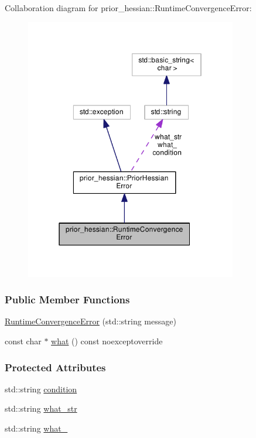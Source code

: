 Collaboration diagram for prior\+\_\+hessian\+:\+:Runtime\+Convergence\+Error\+:\nopagebreak
\begin{figure}[H]
\begin{center}
\leavevmode
\includegraphics[width=262pt]{structprior__hessian_1_1RuntimeConvergenceError__coll__graph}
\end{center}
\end{figure}
\subsubsection*{Public Member Functions}
\begin{DoxyCompactItemize}
\item 
\hyperlink{structprior__hessian_1_1RuntimeConvergenceError_ac6fc04608eb985d12cedefa9d02b20ee}{Runtime\+Convergence\+Error} (std\+::string message)
\item 
const char $\ast$ \hyperlink{classprior__hessian_1_1PriorHessianError_a0d1812ff85f88f12c0fffd12f523263d}{what} () const noexceptoverride
\end{DoxyCompactItemize}
\subsubsection*{Protected Attributes}
\begin{DoxyCompactItemize}
\item 
std\+::string \hyperlink{classprior__hessian_1_1PriorHessianError_a0f00dbb23dc6ba9b3577503755b018c5}{condition}
\item 
std\+::string \hyperlink{classprior__hessian_1_1PriorHessianError_a0d97e1b6b1bcf6a440400706f416375e}{what\+\_\+str}
\item 
std\+::string \hyperlink{classprior__hessian_1_1PriorHessianError_a018e11b5863c2a3a06d37a16a89b14b2}{what\+\_\+}
\end{DoxyCompactItemize}


